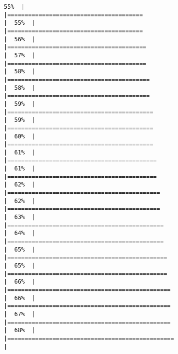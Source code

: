 \documentclass[
]{book}
\begin{document}
\begin{verbatim}
55%  |                                                                              |=======================================                               |  55%  |                                                                              |=======================================                               |  56%  |                                                                              |========================================                              |  57%  |                                                                              |========================================                              |  58%  |                                                                              |=========================================                             |  58%  |                                                                              |=========================================                             |  59%  |                                                                              |==========================================                            |  59%  |                                                                              |==========================================                            |  60%  |                                                                              |==========================================                            |  61%  |                                                                              |===========================================                           |  61%  |                                                                              |===========================================                           |  62%  |                                                                              |============================================                          |  62%  |                                                                              |============================================                          |  63%  |                                                                              |=============================================                         |  64%  |                                                                              |=============================================                         |  65%  |                                                                              |==============================================                        |  65%  |                                                                              |==============================================                        |  66%  |                                                                              |===============================================                       |  66%  |                                                                              |===============================================                       |  67%  |                                                                              |===============================================                       |  68%  |                                                                              |================================================                      |  
\end{verbatim}
\end{document}

